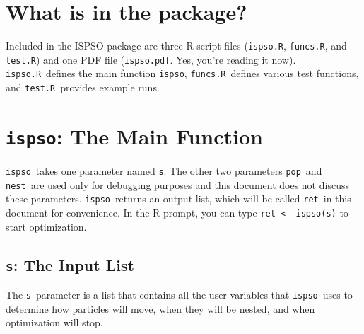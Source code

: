 \documentclass{article}
\def\ispsoR{\texttt{ispso.R}}
\def\funcsR{\texttt{funcs.R}}
\def\testR{\texttt{test.R}}
\def\ispsopdf{\texttt{ispso.pdf}}
\def\ispso{\texttt{ispso}}
\def\s{\texttt{s}}
\def\pop{\texttt{pop}}
\def\nest{\texttt{nest}}
\def\ret{\texttt{ret}}
\begin{document}
\section{What is in the package?}

Included in the ISPSO package are three R script files (\ispsoR, \funcsR, and \testR) and one PDF file (\ispsopdf. Yes, you're reading it now).
\ispsoR\ defines the main function \ispso, \funcsR\ defines various test functions, and \testR\ provides example runs.

\section{\ispso: The Main Function}

\ispso\ takes one parameter named \s.
The other two parameters \pop\ and \nest\ are used only for debugging purposes and this document does not discuss these parameters.
\ispso\ returns an output list, which will be called \ret\ in this document for convenience.
In the R prompt, you can type \texttt{ret <- ispso(s)} to start optimization.

\subsection{\s: The Input List}

The \s\ parameter is a list that contains all the user variables that \ispso\ uses to determine how particles will move, when they will be nested, and when optimization will stop.
\end{document}
